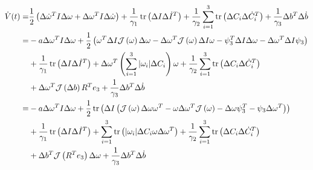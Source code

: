 \begin{align}
  \dot{V}(t)=&\frac{1}{2}\left(\Delta \dot{\omega}^{T} I \Delta \omega
    + \Delta \omega^{T} I \Delta \dot{\omega}\right)+
  \frac{1}{\gamma_1}\operatorname{tr}\left(\Delta I \Delta \dot{I}^{T}\right)+
  \frac{1}{\gamma_2}\sum_{i=1}^3\operatorname{tr}\left(\Delta C_i \Delta
    \dot{C}_i^{T}\right)+ \frac{1}{\gamma_3}\Delta b^T \Delta \dot{b}
  \nonumber \\
  =&-a\Delta\omega^T I\Delta\omega + \frac{1}{2}\left(\omega^T\Delta I
    \mathcal{J}\left( \omega \right)\Delta\omega-\Delta\omega^T\mathcal{J}\left( \omega \right)
    \Delta I \omega- \psi_3^T\Delta I\Delta \omega
    -\Delta\omega^T\Delta I \psi_3\right)
   \nonumber \\
   &+\frac{1}{\gamma_1}\operatorname{tr}\left(\Delta I \Delta \dot{I}^{T}\right)+
    \Delta\omega^T\left(\sum_{i=1}^3 |\omega_i|\Delta C_i\right)\omega+
    \frac{1}{\gamma_2}\sum_{i=1}^3\operatorname{tr}\left(\Delta C_i \Delta
    \dot{C}_i^{T}\right) 
   \nonumber \\
   & +\Delta\omega^T\mathcal{J}\left( \Delta b \right)R^T e_3 +
     \frac{1}{\gamma_3}\Delta b^T \Delta \dot{b}
\nonumber \\
  =&-a\Delta\omega^T I\Delta\omega + \frac{1}{2}\operatorname{tr}\left(\Delta I\left(
    \mathcal{J}\left( \omega \right)\Delta\omega\omega^T-
     \omega \Delta\omega^T \mathcal{J}\left( \omega \right) - \Delta \omega \psi_3^T
    -\psi_3\Delta\omega^T\right)\right)
   \nonumber \\
   &+\frac{1}{\gamma_1}\operatorname{tr}\left(\Delta I \Delta \dot{I}^{T}\right)+
    \sum_{i=1}^3\operatorname{tr}\left(|\omega_i|\Delta C_i\omega \Delta\omega^T\right)+
    \frac{1}{\gamma_2}\sum_{i=1}^3\operatorname{tr}\left(\Delta C_i \Delta
    \dot{C}_i^{T}\right) 
   \nonumber \\
   & +\Delta b^T\mathcal{J}\left( R^T e_3 \right)\Delta \omega +
     \frac{1}{\gamma_3}\Delta b^T \Delta \dot{b}
\label{chUV_AID.eq.UV_SO3_lyapDotLong}
\end{align}
